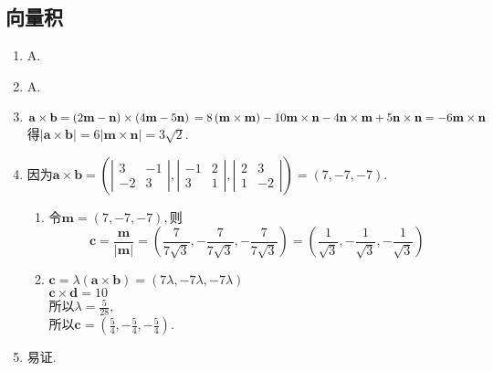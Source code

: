 \documentclass[UTF8]{ctexart}
\begin{document}
\subsection{向量积}
\begin{enumerate}
\item A.
\item A.
\item $\mathbf{a}\times\mathbf{b}\\
=\left(2\mathbf{m}-\mathbf{n}\right)\times\left(4\mathbf{m}-5\mathbf{n}\right)\\
=8\left(\mathbf{m}\times\mathbf{m}\right)-10\mathbf{m}\times\mathbf{n}-4\mathbf{n}\times\mathbf{m}+5\mathbf{n}\times\mathbf{n}\\
=-6\mathbf{m}\times\mathbf{n}$\\
得$\left|\mathbf{a}\times\mathbf{b}\right|=6\left|\mathbf{m}\times\mathbf{n}\right|=3\sqrt{2}.$

\item 因为$\mathbf{a}\times\mathbf{b}=\left(\left|\begin{array}{cc}3&-1\\-2&3\end{array}\right|,\left|\begin{array}{cc}-1&2\\3&1\end{array}\right|,\left|\begin{array}{cc}2&3\\1&-2\end{array}\right|\right)=\left(7,-7,-7\right).$
\begin{enumerate}[(1)]
\item 令$\mathbf{m}=\left(7,-7,-7\right),$则$$\mathbf{c}=\displaystyle\frac{\mathbf{m}}{\left|\mathbf{m}\right|}=\left(\displaystyle\frac{7}{7\sqrt{3}},\displaystyle-\frac{7}{7\sqrt{3}},-\displaystyle\frac{7}{7\sqrt{3}}\right)=\left(\displaystyle\frac{1}{\sqrt{3}},\displaystyle-\frac{1}{\sqrt{3}},-\displaystyle\frac{1}{\sqrt{3}}\right)$$
\item $\mathbf{c}=\lambda\left(\mathbf{a}\times\mathbf{b}\right)=\left(7\lambda,-7\lambda,-7\lambda\right)$\\
$\mathbf{c}\times\mathbf{d}=10$\\
所以$\lambda=\displaystyle\frac{5}{28},$\\
所以$\mathbf{c}=\left(\displaystyle\frac{5}{4},-\displaystyle\frac{5}{4},-\displaystyle\frac{5}{4}\right).$\end{enumerate}

\item 易证.


\end{enumerate}
\end{document}

